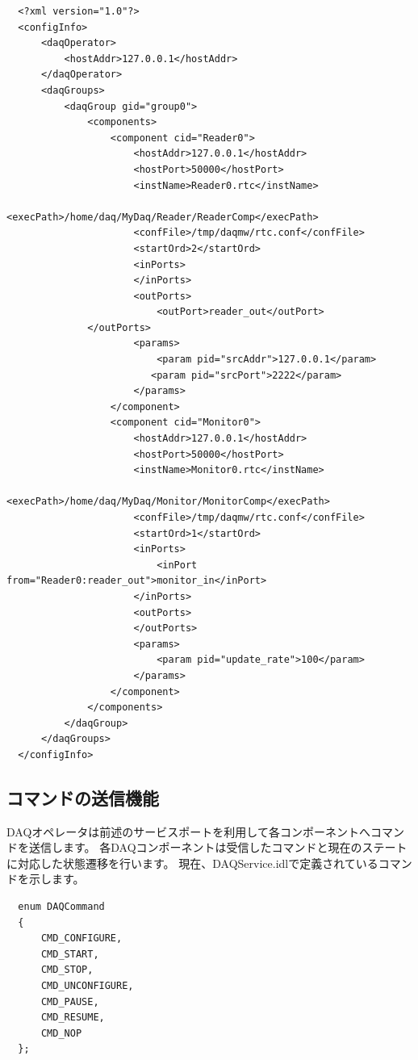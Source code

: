 \documentclass[a4j,10pt,dvips,onecolumn,oneside,final]{jarticle}%
\begin{document}
\begin{Verbatim}
  <?xml version="1.0"?>
  <configInfo>
      <daqOperator>
          <hostAddr>127.0.0.1</hostAddr>
      </daqOperator>
      <daqGroups>
          <daqGroup gid="group0">
              <components>
                  <component cid="Reader0">
                      <hostAddr>127.0.0.1</hostAddr>
                      <hostPort>50000</hostPort>
                      <instName>Reader0.rtc</instName>
                      <execPath>/home/daq/MyDaq/Reader/ReaderComp</execPath>
                      <confFile>/tmp/daqmw/rtc.conf</confFile>
                      <startOrd>2</startOrd>
                      <inPorts>
                      </inPorts>
                      <outPorts>
                          <outPort>reader_out</outPort>
		      </outPorts>
                      <params>
                          <param pid="srcAddr">127.0.0.1</param>
                         <param pid="srcPort">2222</param>
                      </params>
                  </component>
                  <component cid="Monitor0">
                      <hostAddr>127.0.0.1</hostAddr>
                      <hostPort>50000</hostPort>
                      <instName>Monitor0.rtc</instName>
                      <execPath>/home/daq/MyDaq/Monitor/MonitorComp</execPath>
                      <confFile>/tmp/daqmw/rtc.conf</confFile>
                      <startOrd>1</startOrd>
                      <inPorts>
                          <inPort from="Reader0:reader_out">monitor_in</inPort>
                      </inPorts>
                      <outPorts>
                      </outPorts>
                      <params>
                          <param pid="update_rate">100</param>
                      </params>
                  </component>
              </components>
          </daqGroup>
      </daqGroups>
  </configInfo>
\end{Verbatim}

\subsection{コマンドの送信機能}
DAQオペレータは前述のサービスポートを利用して各コンポーネントへコマンドを送信します。
各DAQコンポーネントは受信したコマンドと現在のステートに対応した状態遷移を行います。
現在、DAQService.idlで定義されているコマンドを示します。
\begin{Verbatim}
  enum DAQCommand
  {
      CMD_CONFIGURE,
      CMD_START,
      CMD_STOP,
      CMD_UNCONFIGURE,
      CMD_PAUSE,
      CMD_RESUME,
      CMD_NOP
  };
\end{Verbatim}
\end{document}
